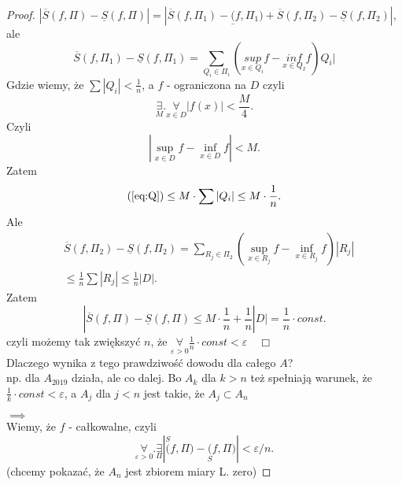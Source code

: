 \documentclass[../main.tex]{subfiles}
\begin{document}
\begin{proof}
        $|\overline{S}(f,\Pi) - \underline{S}(f,\Pi)| = |\overline{S}(f,\Pi_1) - \underline(f,\Pi_1) + \overline{S}(f,\Pi_2) - \underline{S}(f,\Pi_2)|$, ale
        \begin{equation}\label{eq:Q}
            \overline{S}(f,\Pi_1) - \underline{S}(f,\Pi_1) = \sum_{Q_i\in\Pi_i}(\underset{x\in Q_i}{sup} f - \underset{x\in Q_I}{inf} f) Q_i |
        \end{equation}
        Gdzie wiemy, że $\sum |Q_i| < \frac{1}{n}$, a $f$ - ograniczona na $D$ czyli
        \[
            \underset{M}{\exists} .\underset{x\in D}{\forall} |f(x)| < \frac{M}{4}
        .\] Czyli
        \[
        |\underset{x\in D}{\sup} f - \underset{x\in D}{\inf} f | < M
        .\] Zatem
        \[
            \text{(\ref{eq:Q})} \le M \cdot \sum |Q_i| \le M \cdot  \frac{1}{n}
        .\]
        Ale
        \begin{align*}
            &\overline{S}(f,\Pi_2) - \underline{S}(f,\Pi_2) = \sum_{R_j \in \Pi_2}(\underset{x\in R_j}{\sup} f - \underset{x\in R_j}{\inf} f) |R_j|\\
            &\le \frac{1}{n} \sum |R_j| \le \frac{1}{n} |D|
        .\end{align*}
        Zatem
        \[
            |\overline{S}(f,\Pi) - \underline{S}(f,\Pi) \le M \cdot \frac{1}{n} + \frac{1}{n} |D| = \frac{1}{n} \cdot  const
        .\]
        czyli możemy tak zwiększyć $n$, że $\underset{\varepsilon>0}{\forall} \frac{1}{n}\cdot const < \varepsilon \quad\Box$\\
        Dlaczego wynika z tego prawdziwość dowodu dla całego $A$?\\
        np. dla $A_{2019}$ działa, ale co dalej. Bo $A_k$ dla $k>n$ też spełniają warunek, że $\frac{1}{k}\cdot const < \varepsilon$, a $A_j$ dla $j<n$ jest takie, że $A_j \subset A_n$

        $\implies$\\
        Wiemy, że $f$ - całkowalne, czyli
        \[
            \underset{\varepsilon>0}{\forall} . \underset{\Pi}{\exists} |\overset{S}(f,\Pi) - \underset{S}(f,\Pi) | < \varepsilon / n
        .\] (chcemy pokazać, że $A_n$ jest zbiorem miary L. zero)


\end{proof}
\end{document}
